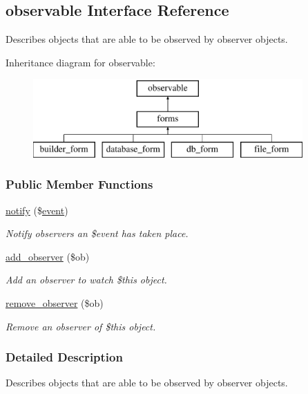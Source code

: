 \hypertarget{interfaceobservable}{\subsection{observable Interface Reference}
\label{interfaceobservable}
}


Describes objects that are able to be observed by observer objects.  


Inheritance diagram for observable\-:\begin{figure}[H]
\begin{center}
\leavevmode
\includegraphics[height=3.000000cm]{interfaceobservable}
\end{center}
\end{figure}
\subsubsection*{Public Member Functions}
\begin{DoxyCompactItemize}
\item 
\hyperlink{interfaceobservable_aa4d6d161d4154a3525e93f6c051e1914}{notify} (\$\hyperlink{classevent}{event})
\begin{DoxyCompactList}\small\item\em Notify observers an \$event has taken place. \end{DoxyCompactList}\item 
\hyperlink{interfaceobservable_aa4c1e85f5ec861411aa1d99ee0471082}{add\-\_\-observer} (\$ob)
\begin{DoxyCompactList}\small\item\em Add an observer to watch \$this object. \end{DoxyCompactList}\item 
\hyperlink{interfaceobservable_aea49f4e7d1c3181031e50c15e0bfd9d4}{remove\-\_\-observer} (\$ob)
\begin{DoxyCompactList}\small\item\em Remove an observer of \$this object. \end{DoxyCompactList}\end{DoxyCompactItemize}


\subsubsection{Detailed Description}
Describes objects that are able to be observed by observer objects. 

